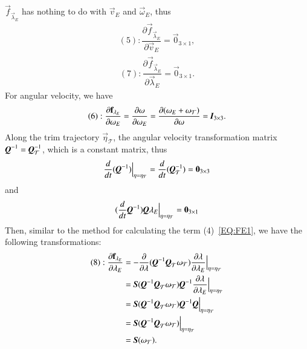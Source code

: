 $\vec{f}_{\vec{\lambda}_{E}}$ has nothing to do with $\vec{v}_{E}$ and $\vec{\omega}_{E}$, thus 
\begin{align}
(5): \dfrac{\partial \vec{f}_{\vec{\lambda}_{E}}}{\partial \vec{v}_{E}}=\vec{0}_{3\times 1},\label{EQ:OE3}
\end{align}
\begin{align}
(7): \dfrac{\partial \vec{f}_{\vec{\lambda}_{E}}}{\partial \vec{\lambda}_{E}}=\vec{0}_{3\times 1}.\label{EQ:OE4}
\end{align}
For angular velocity, we have
\begin{align}
(6): \dfrac{\partial \vec{f}_{\vec{\lambda}_{E}}}{\partial \vec{\omega}_{E}}=\dfrac{\partial\vec{\omega}}{\partial \vec{\omega}_{E}}=\dfrac{\partial (\vec{\omega}_{E}+\vec{\omega}_{\mathcal{T}})}{\partial \vec{\omega}}
=\emph{\textbf{I}}_{3 \times 3}.\label{EQ:OE5}
\end{align}
Along the trim trajectory $\vec{\eta}_{\mathcal{T}}$, the angular velocity transformation matrix $\emph{\textbf{Q}}^{-1}=\emph{\textbf{Q}}_{\mathcal{T}}^{-1}$, which is a constant matrix, thus 
\begin{align}
\dfrac{d}{dt}(\emph{\textbf{Q}}^{-1})\Bigr|_{\vec{\eta}=\vec{\eta}_{\mathcal{T}}}=\dfrac{d}{dt}(\emph{\textbf{Q}}_{\mathcal{T}}^{-1})=\vec{0}_{3\times 3}
\end{align}
and
\begin{align}
(\dfrac{d}{dt}\emph{\textbf{Q}}^{-1})\emph{\textbf{Q}}\vec{\lambda}_{E}\Bigr|_{\vec{\eta}=\vec{\eta}_{\mathcal{T}}}=\vec{0}_{3 \times 1}
\end{align}
Then, similar to the method for calculating the term (4)~\ref{EQ:FE1}, we have the following transformations:
\begin{align}
(8):\dfrac{\partial \vec{f}_{\vec{\lambda}_{E}}}{\partial \vec{\lambda}_{E}}
&=-\dfrac{\partial}{\partial \vec{\lambda}}(\emph{\textbf{Q}}^{-1}\emph{\textbf{Q}}_{\mathcal{T}}
\vec{\omega}_{\mathcal{T}})\dfrac{\partial \vec{\lambda}}{\partial \vec{\lambda}_{E}}\Bigr|_{\vec{\eta}=\vec{\eta}_{\mathcal{T}}} \nonumber \\
&=\emph{\textbf{S}}(\emph{\textbf{Q}}^{-1}\emph{\textbf{Q}}_{\mathcal{T}}\vec{\omega}_{\mathcal{T}})
\emph{\textbf{Q}}^{-1}
\dfrac{\partial \vec{\lambda}}{\partial \vec{\lambda}_{E}}\Bigr|_{\vec{\eta}=\vec{\eta}_{\mathcal{T}}} \nonumber \\
&=\emph{\textbf{S}}(\emph{\textbf{Q}}^{-1}\emph{\textbf{Q}}_{\mathcal{T}}\vec{\omega}_{\mathcal{T}})
\emph{\textbf{Q}}^{-1}\emph{\textbf{Q}}\Bigr|_{\vec{\eta}=\vec{\eta}_{\mathcal{T}}} \nonumber \\
&=\emph{\textbf{S}}(\emph{\textbf{Q}}^{-1}\emph{\textbf{Q}}_{\mathcal{T}}\vec{\omega}_{\mathcal{T}})
\Bigr|_{\vec{\eta}=\vec{\eta}_{\mathcal{T}}} \nonumber \\
&=\emph{\textbf{S}}(\vec{\omega}_{\mathcal{T}}).\label{EQ:OE6}
\end{align}
